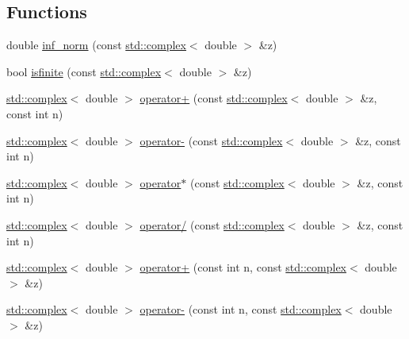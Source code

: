\subsection*{Functions}
\begin{DoxyCompactItemize}
\item 
double \hyperlink{complex__functions_8H_ad94a1be6cb74ee6d43c816d7723f17c9}{inf\-\_\-norm} (const \hyperlink{Constants_8h_a1c1b16cc02d518bbe753449171ab7033}{std\-::complex}$<$ double $>$ \&z)
\item 
bool \hyperlink{complex__functions_8H_a620d539dcfcd19bcfaf73a750cb8fb17}{isfinite} (const \hyperlink{Constants_8h_a1c1b16cc02d518bbe753449171ab7033}{std\-::complex}$<$ double $>$ \&z)
\item 
\hyperlink{Constants_8h_a1c1b16cc02d518bbe753449171ab7033}{std\-::complex}$<$ double $>$ \hyperlink{complex__functions_8H_a4a2141962d94a9869ca6d89f1d6cd450}{operator+} (const \hyperlink{Constants_8h_a1c1b16cc02d518bbe753449171ab7033}{std\-::complex}$<$ double $>$ \&z, const int n)
\item 
\hyperlink{Constants_8h_a1c1b16cc02d518bbe753449171ab7033}{std\-::complex}$<$ double $>$ \hyperlink{complex__functions_8H_ad627c57bd87bc5df69f426e1ae25899f}{operator-\/} (const \hyperlink{Constants_8h_a1c1b16cc02d518bbe753449171ab7033}{std\-::complex}$<$ double $>$ \&z, const int n)
\item 
\hyperlink{Constants_8h_a1c1b16cc02d518bbe753449171ab7033}{std\-::complex}$<$ double $>$ \hyperlink{complex__functions_8H_a9063a27573f1acc4c7e2f12b4cb077d1}{operator$\ast$} (const \hyperlink{Constants_8h_a1c1b16cc02d518bbe753449171ab7033}{std\-::complex}$<$ double $>$ \&z, const int n)
\item 
\hyperlink{Constants_8h_a1c1b16cc02d518bbe753449171ab7033}{std\-::complex}$<$ double $>$ \hyperlink{complex__functions_8H_a512bb50d58b655a525681aa22b1c5fa3}{operator/} (const \hyperlink{Constants_8h_a1c1b16cc02d518bbe753449171ab7033}{std\-::complex}$<$ double $>$ \&z, const int n)
\item 
\hyperlink{Constants_8h_a1c1b16cc02d518bbe753449171ab7033}{std\-::complex}$<$ double $>$ \hyperlink{complex__functions_8H_a04be43d26696b2fe81e6da86f449bd61}{operator+} (const int n, const \hyperlink{Constants_8h_a1c1b16cc02d518bbe753449171ab7033}{std\-::complex}$<$ double $>$ \&z)
\item 
\hyperlink{Constants_8h_a1c1b16cc02d518bbe753449171ab7033}{std\-::complex}$<$ double $>$ \hyperlink{complex__functions_8H_afbbbc220bd372160271d192649fc5b5e}{operator-\/} (const int n, const \hyperlink{Constants_8h_a1c1b16cc02d518bbe753449171ab7033}{std\-::complex}$<$ double $>$ \&z)

\end{DoxyCompactItemize}
